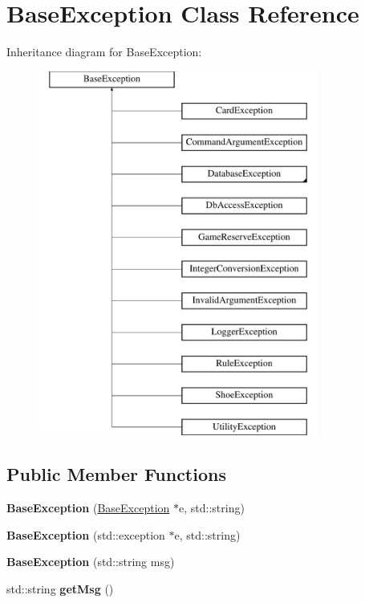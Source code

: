 \hypertarget{classBaseException}{
\section{\-Base\-Exception \-Class \-Reference}
\label{d0/d6c/classBaseException}
}
\-Inheritance diagram for \-Base\-Exception\-:\begin{figure}[H]
\begin{center}
\leavevmode
\includegraphics[height=12.000000cm]{d0/d6c/classBaseException}
\end{center}
\end{figure}
\subsection*{\-Public \-Member \-Functions}
\begin{DoxyCompactItemize}
\item 
\hypertarget{classBaseException_a1ffe60a4405ea55088f1ceb10997f034}{
{\bfseries \-Base\-Exception} (\hyperlink{classBaseException}{\-Base\-Exception} $\ast$e, std\-::string)}
\label{d0/d6c/classBaseException_a1ffe60a4405ea55088f1ceb10997f034}

\item 
\hypertarget{classBaseException_a70b9c097d5a1d2e52eb6fc6f50cf581b}{
{\bfseries \-Base\-Exception} (std\-::exception $\ast$e, std\-::string)}
\label{d0/d6c/classBaseException_a70b9c097d5a1d2e52eb6fc6f50cf581b}

\item 
\hypertarget{classBaseException_a7d38ab8844d208a73fc5552557705949}{
{\bfseries \-Base\-Exception} (std\-::string msg)}
\label{d0/d6c/classBaseException_a7d38ab8844d208a73fc5552557705949}

\item 
\hypertarget{classBaseException_af86074159f2c4d22806b08f11da860a3}{
std\-::string {\bfseries get\-Msg} ()}
\label{d0/d6c/classBaseException_af86074159f2c4d22806b08f11da860a3}

\end{DoxyCompactItemize}



